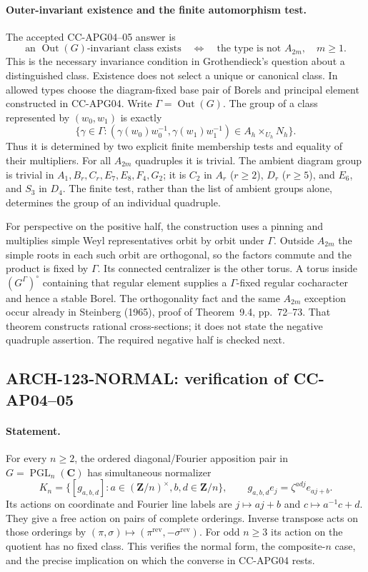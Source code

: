 \paragraph{Outer-invariant existence and the finite automorphism test.}
The accepted CC-APG04--05 answer is
\[
 \text{an $\operatorname{Out}(G)$-invariant class exists}
 \quad\Longleftrightarrow\quad
 \text{the type is not }A_{2m},\quad m\geq1.
\]
This is the necessary invariance condition in Grothendieck's question
about a distinguished class.  Existence does not select a unique or
canonical class.  In allowed types choose the diagram-fixed base pair
of Borels and principal element constructed in CC-APG04.  Write
$\Gamma=\operatorname{Out}(G)$.  The group of a class represented by
$(w_0,w_1)$ is exactly
\[
 \{\gamma\in\Gamma:
 (\gamma(w_0)w_0^{-1},\gamma(w_1)w_1^{-1})
               \in A_h\times_{U_h}N_h\}.
\]
Thus it is determined by two explicit finite membership tests and
equality of their multipliers.  For all $A_{2m}$ quadruples it is
trivial.  The ambient diagram group is trivial in
$A_1,B_r,C_r,E_7,E_8,F_4,G_2$; it is $C_2$ in
$A_r$ ($r\geq2$), $D_r$ ($r\geq5$), and $E_6$, and $S_3$ in $D_4$.
The finite test, rather than the list of ambient groups alone,
determines the group of an individual quadruple.

For perspective on the positive half, the construction uses a pinning
and multiplies simple Weyl representatives orbit by orbit under
$\Gamma$.  Outside $A_{2m}$ the simple roots in each such orbit are
orthogonal, so the factors commute and the product is fixed by
$\Gamma$.  Its connected centralizer is the other torus.  A torus
inside $(G^\Gamma)^\circ$ containing that regular element supplies a
$\Gamma$-fixed regular cocharacter and hence a stable Borel.  The
orthogonality fact and the same $A_{2m}$ exception occur already in
Steinberg (1965), proof of Theorem~9.4, pp.~72--73.  That theorem
constructs rational cross-sections; it does not state the negative
quadruple assertion.  The required negative half is checked next.

\subsection{ARCH-123-NORMAL: verification of CC-AP04--05}
\label{arch123normal}
\paragraph{Statement.}
For every $n\geq2$, the ordered diagonal/Fourier apposition pair in
$G=\operatorname{PGL}_n(\mathbf C)$ has simultaneous normalizer
\[
 K_n=\{[g_{a,b,d}]:a\in(\mathbf Z/n)^\times, b,d\in\mathbf Z/n\},
 \qquad g_{a,b,d}e_j=\zeta^{ad j}e_{aj+b}.
\]
Its actions on coordinate and Fourier line labels are
$j\mapsto aj+b$ and $c\mapsto a^{-1}c+d$.  They give a free action
on pairs of complete orderings.  Inverse transpose acts on those
orderings by $(\pi,\sigma)\mapsto(\pi^{\mathrm{rev}},
-\sigma^{\mathrm{rev}})$.  For odd $n\geq3$ its action on the quotient
has no fixed class.  This verifies the normal form, the composite-$n$
case, and the precise implication on which the converse in CC-APG04
rests.

